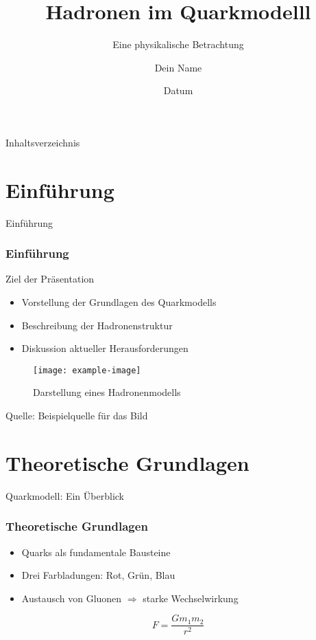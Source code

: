 \documentclass[aspectratio=169]{beamer} %
\title{Hadronen im Quarkmodelll}
\subtitle{Eine physikalische Betrachtung}
\author{Dein Name}
\date{Datum}
\begin{document}
	
	\begin{frame}
		\titlepage
	\end{frame}
	
	\begin{frame}{Inhaltsverzeichnis}
		\tableofcontents
	\end{frame}
	
	\section{Einführung}
	\begin{frame}{Einführung}
		\frametitle{Einführung}
		\begin{block}{Ziel der Präsentation}
			\begin{itemize}
				\item Vorstellung der Grundlagen des Quarkmodells
				\item Beschreibung der Hadronenstruktur
				\item Diskussion aktueller Herausforderungen
			\end{itemize}
		\end{block}
		\begin{figure}
			\centering
			\texttt{[image: example-image]} %
			\caption{Darstellung eines Hadronenmodells}
		\end{figure}
		\vfill
		\tiny Quelle: Beispielquelle für das Bild
	\end{frame}
	
	\section{Theoretische Grundlagen}
	\begin{frame}{Quarkmodell: Ein Überblick}
		\frametitle{Theoretische Grundlagen}
		\begin{itemize}
			\item Quarks als fundamentale Bausteine
			\item Drei Farbladungen: Rot, Grün, Blau
			\item Austausch von Gluonen $\Rightarrow$ starke Wechselwirkung
		\end{itemize}
		\begin{equation}
			F = \frac{Gm_1m_2}{r^2} %
		\end{equation}
	\end{frame}
	
\end{document}
